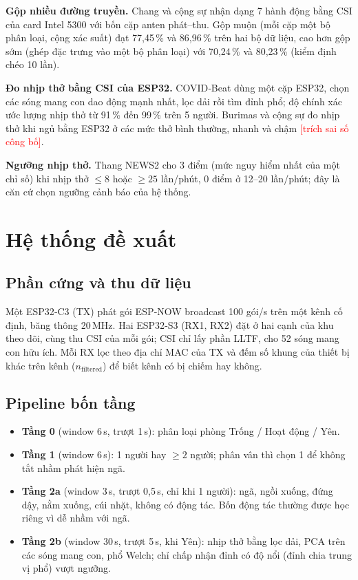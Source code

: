 \documentclass[conference]{IEEEtran}
\newcommand{\canlam}[1]{\textcolor{red}{[#1]}}
\begin{document}
\textbf{Gộp nhiều đường truyền.} Chang và cộng sự \cite{fusion2016} nhận dạng 7 hành động bằng CSI của card Intel 5300
với bốn cặp anten phát–thu. Gộp muộn (mỗi cặp một bộ phân loại, cộng xác suất) đạt 77,45\,\% và 86,96\,\% trên hai bộ
dữ liệu, cao hơn gộp sớm (ghép đặc trưng vào một bộ phân loại) với 70,24\,\% và 80,23\,\% (kiểm định chéo 10 lần).

\textbf{Đo nhịp thở bằng CSI của ESP32.} COVID‑Beat \cite{covidbeat} dùng một cặp ESP32, chọn các sóng mang con dao động
mạnh nhất, lọc dải rồi tìm đỉnh phổ; độ chính xác ước lượng nhịp thở từ 91\,\% đến 99\,\% trên 5 người. Burimas và cộng
sự \cite{appsci2024} đo nhịp thở khi ngủ bằng ESP32 ở các mức thở bình thường, nhanh và chậm \canlam{trích sai số công
bố}.

\textbf{Ngưỡng nhịp thở.} Thang NEWS2 \cite{news2} cho 3 điểm (mức nguy hiểm nhất của một chỉ số) khi nhịp thở $\le 8$
hoặc $\ge 25$ lần/phút, 0 điểm ở 12–20 lần/phút; đây là căn cứ chọn ngưỡng cảnh báo của hệ thống.

\section{Hệ thống đề xuất}
\subsection{Phần cứng và thu dữ liệu}
Một ESP32‑C3 (TX) phát gói ESP‑NOW broadcast 100 gói/s trên một kênh cố định, băng thông 20\,MHz. Hai ESP32‑S3 (RX1,
RX2) đặt ở hai cạnh của khu theo dõi, cùng thu CSI của mỗi gói; CSI chỉ lấy phần LLTF, cho 52 sóng mang con hữu ích.
Mỗi RX lọc theo địa chỉ MAC của TX và đếm số khung của thiết bị khác trên kênh ($n_\text{filtered}$) để biết kênh có bị
chiếm hay không.

\subsection{Pipeline bốn tầng}
\begin{itemize}
  \item \textbf{Tầng 0} (window 6\,s, trượt 1\,s): phân loại phòng Trống / Hoạt động / Yên.
  \item \textbf{Tầng 1} (window 6\,s): 1 người hay $\ge 2$ người; phân vân thì chọn 1 để không tắt nhầm phát hiện ngã.
  \item \textbf{Tầng 2a} (window 3\,s, trượt 0,5\,s, chỉ khi 1 người): ngã, ngồi xuống, đứng dậy, nằm xuống, cúi nhặt,
    không có động tác. Bốn động tác thường được học riêng vì dễ nhầm với ngã.
  \item \textbf{Tầng 2b} (window 30\,s, trượt 5\,s, khi Yên): nhịp thở bằng lọc dải, PCA trên các sóng mang con, phổ
    Welch; chỉ chấp nhận đỉnh có độ nổi (đỉnh chia trung vị phổ) vượt ngưỡng.
\end{itemize}
\end{document}
